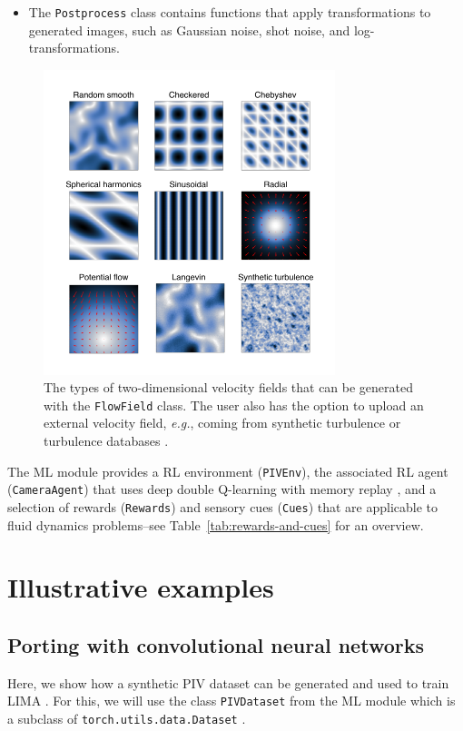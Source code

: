 \documentclass[a4paper,fleqn]{cas-dc}
\begin{document}
\begin{itemize}
\item The \texttt{Postprocess} class contains functions that apply transformations to generated images, such as Gaussian noise, shot noise, and log-transformations.
\end{itemize}

\begin{figure}[t]
\centering
\includegraphics[width=8.5cm]{velocity-fields.pdf}
\caption{The types of two-dimensional velocity fields that can be generated with the \texttt{FlowField} class. The user also has the option to upload an external velocity field, \textit{e.g.}, coming from synthetic turbulence \citep{saad2017scalable, richards2018fast} or turbulence databases \cite{perlman2007data}.}
\label{fig:velocity-fields}
\end{figure}

The ML module provides a RL environment (\texttt{PIVEnv}), the associated RL agent (\texttt{CameraAgent}) that uses deep double Q-learning with memory replay \cite{}, and a selection of rewards (\texttt{Rewards}) and sensory cues (\texttt{Cues}) that are applicable to fluid dynamics problems--see Table~\ref{tab:rewards-and-cues} for an overview.

\section{Illustrative examples} \label{sec:examples}

\subsection{Porting with convolutional neural networks}

Here, we show how a synthetic PIV dataset can be generated and used to train LIMA \cite{manickathan2023lightweight}. For this, we will use the class \texttt{PIVDataset} from the ML module which is a subclass of \texttt{torch.utils.data.Dataset} \cite{paszke2019pytorch}.
\end{document}
